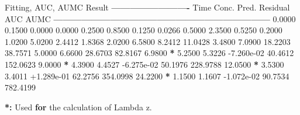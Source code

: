 \documentclass[12pt,]{krantz}
\newenvironment{Shaded}{\begin{snugshade}}{\end{snugshade}}
\newcommand{\ControlFlowTok}[1]{\textcolor[rgb]{0.13,0.29,0.53}{\textbf{#1}}}
\newcommand{\ErrorTok}[1]{\textcolor[rgb]{0.64,0.00,0.00}{\textbf{#1}}}
\newcommand{\FloatTok}[1]{\textcolor[rgb]{0.00,0.00,0.81}{#1}}
\newcommand{\NormalTok}[1]{#1}
\newcommand{\OperatorTok}[1]{\textcolor[rgb]{0.81,0.36,0.00}{\textbf{#1}}}
\newcommand{\StringTok}[1]{\textcolor[rgb]{0.31,0.60,0.02}{#1}}
\begin{document}
\begin{Shaded}
\begin{Highlighting}[]
{{{{\NormalTok{Fitting, AUC, AUMC Result}
\OperatorTok{-------------------------}
\StringTok{      }\NormalTok{Time         Conc.      Pred.   Residual       AUC       AUMC}
\OperatorTok{---------------------------------------------------------------------}
\StringTok{     }\FloatTok{0.0000}       \FloatTok{0.1500}                           \FloatTok{0.0000}     \FloatTok{0.0000}
     \FloatTok{0.2500}       \FloatTok{0.8500}                           \FloatTok{0.1250}     \FloatTok{0.0266}
     \FloatTok{0.5000}       \FloatTok{2.3500}                           \FloatTok{0.5250}     \FloatTok{0.2000}
     \FloatTok{1.0200}       \FloatTok{5.0200}                           \FloatTok{2.4412}     \FloatTok{1.8368}
     \FloatTok{2.0200}       \FloatTok{6.5800}                           \FloatTok{8.2412}    \FloatTok{11.0428}
     \FloatTok{3.4800}       \FloatTok{7.0900}                          \FloatTok{18.2203}    \FloatTok{38.7571}
     \FloatTok{5.0000}       \FloatTok{6.6600}                          \FloatTok{28.6703}    \FloatTok{82.8167}
     \FloatTok{6.9800} \OperatorTok{*}\StringTok{     }\FloatTok{5.2500}     \FloatTok{5.3226} \FloatTok{-7.260e-02}    \FloatTok{40.4612}   \FloatTok{152.0623}
     \FloatTok{9.0000} \OperatorTok{*}\StringTok{     }\FloatTok{4.3900}     \FloatTok{4.4527} \FloatTok{-6.275e-02}    \FloatTok{50.1976}   \FloatTok{228.9788}
    \FloatTok{12.0500} \OperatorTok{*}\StringTok{     }\FloatTok{3.5300}     \FloatTok{3.4011} \FloatTok{+1.289e-01}    \FloatTok{62.2756}   \FloatTok{354.0998}
    \FloatTok{24.2200} \OperatorTok{*}\StringTok{     }\FloatTok{1.1500}     \FloatTok{1.1607} \FloatTok{-1.072e-02}    \FloatTok{90.7534}   \FloatTok{782.4199}

\OperatorTok{*}\ErrorTok{:}\StringTok{ }\NormalTok{Used }\ControlFlowTok{for}\NormalTok{ the calculation of Lambda z.}


}}}}
\end{Highlighting}
\end{Shaded}
\end{document}
